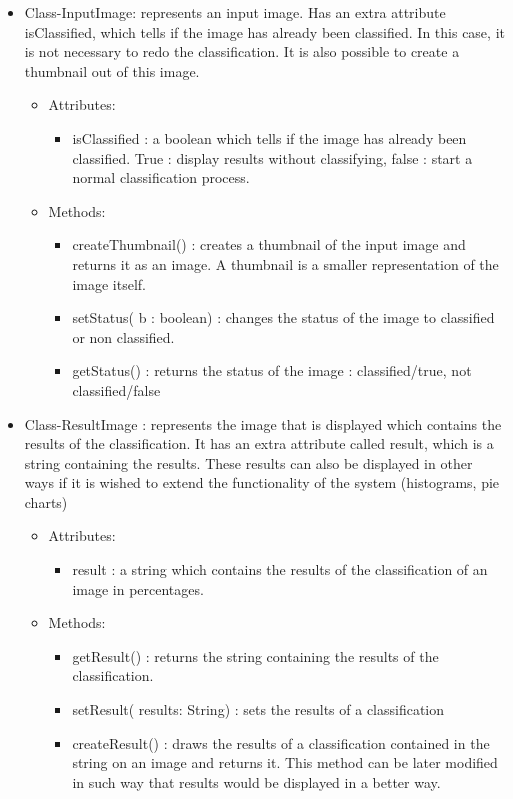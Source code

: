 \documentclass[parskip=full]{scrartcl}
\begin{document}
\pagebreak



\begin{itemize}
	\item Class-InputImage: represents an input image. Has an extra attribute isClassified, which tells if the image has already been classified. In this case, it is not necessary to redo the classification. It is also possible to create a thumbnail out of this image.
	\begin{itemize}
		\item Attributes: 
		\begin{itemize}
			\item isClassified : a boolean which tells if the image has already been classified. True : display results without classifying, false : start a normal classification process.
		\end{itemize}
		\item Methods:
		\begin{itemize}
			\item createThumbnail() : creates a thumbnail of the input image and returns it as an image. A thumbnail is a smaller representation of the image itself.
			\item setStatus( b : boolean) : changes the status of the image to classified or non classified.
			\item getStatus() : returns the status of the image : classified/true, not classified/false
		\end{itemize}
	\end{itemize}

	\item Class-ResultImage : represents the image that is displayed which contains the results of the classification. It has an extra attribute called result, which is a string containing the results. These results can also be displayed in other ways if it is wished to extend the functionality of the system (histograms, pie charts)
	\begin{itemize}
		\item Attributes:
		\begin{itemize}
			\item result : a string which contains the results of the classification of an image in percentages.
		\end{itemize}
		\item Methods:
		\begin{itemize}
			\item getResult() : returns the string containing the results of the classification.
			\item setResult( results: String) : sets the results of a classification
			\item createResult() : draws the results of a classification contained in the string on an image and returns it. This method can be later modified in such way that results would be displayed in a better way.
		\end{itemize}
	\end{itemize}
\end{itemize}
\end{document}
